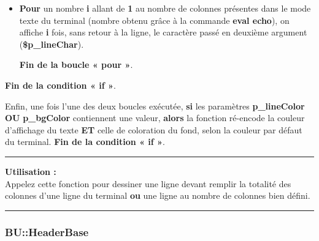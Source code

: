 \documentclass[a4paper,10pt]{article}
\begin{document}
\begin{itemize}
    \item
    {
        \begin{justify}
            \textbf{\color{loop}Pour} un nombre \textbf{\color{vars}i} allant de \textbf{\color{loop}1} au nombre de colonnes présentes dans le mode texte du terminal (nombre obtenu grâce à la commande \textbf{\color{cmds}eval echo}), on affiche \textbf{\color{vars}i} fois, sans retour à la ligne, le caractère passé en deuxième argument (\textbf{\color{vars}\$p\_lineChar}).
        \end{justify}\setlength{\parskip}{1em}

        \begin{justify}
            \textbf{\color{loop}Fin de la boucle « pour »}.
        \end{justify}
    }
\end{itemize}

\begin{justify}
    \textbf{\color{cond}Fin de la condition « if »}.
\end{justify}

\setlength{\parskip}{2em}


\begin{justify}
    Enfin, une fois l'une des deux boucles exécutée, \textbf{\color{cond}si} les paramètres \textbf{\color{vars}p\_lineColor} \textbf{\color{cond}OU} \textbf{\color{vars}p\_bgColor} contiennent une valeur, \textbf{\color{cond}alors} la fonction ré-encode la couleur d'affichage du texte \textbf{ET} celle de coloration du fond, selon la couleur par défaut du terminal. \textbf{\color{cond}Fin de la condition « if »}.
\end{justify}\setlength{\parskip}{1em}

\par\noindent\rule{\textwidth}{0.4pt}

\begin{justify}
    \textbf{Utilisation :}\\[1\baselineskip]
    Appelez cette fonction pour dessiner une ligne devant remplir la totalité des colonnes d'une ligne du terminal \textbf{ou} une ligne au nombre de colonnes bien défini.
\end{justify}



\color{sec3}\par\noindent\rule{\textwidth}{0.4pt}\color{text}

\color{sec3}
\subsubsection{BU::HeaderBase}\color{text}
\end{document}
